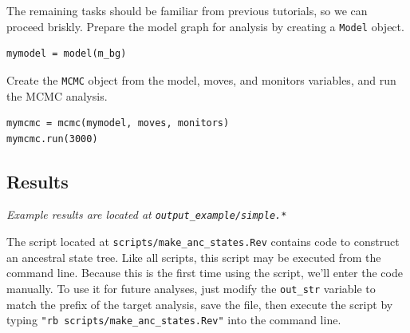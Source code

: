 The remaining tasks should be familiar from previous tutorials, so we can proceed briskly.
Prepare the model graph for analysis by creating a {\tt Model} object.
\begin{snugshade}
\begin{lstlisting}
mymodel = model(m_bg)
\end{lstlisting}
\end{snugshade}


Create the {\tt MCMC} object from the model, moves, and monitors variables, and run the MCMC analysis.
\begin{snugshade}
\begin{lstlisting}
mymcmc = mcmc(mymodel, moves, monitors)
mymcmc.run(3000)
\end{lstlisting}
\end{snugshade}

\subsection*{Results}

\begin{center}
{\it Example results are located at \tt{output\_example/simple.*}}
\end{center}

The script located at {\tt scripts/make\_anc\_states.Rev} contains code to construct an ancestral state tree.
Like all \RevBayes scripts, this script may be executed from the command line.
Because this is the first time using the script, we'll enter the code manually.
To use it for future analyses, just modify the {\tt out\_str} variable to match the prefix of the target analysis, save the file, then execute the script by typing {\tt "rb scripts/make\_anc\_states.Rev"} into the command line.

